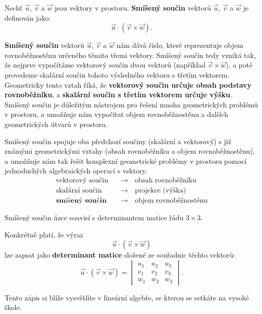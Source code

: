 \begin{definition}\label{def:scalar_triple_product}
    Nechť $\vec{u}$, $\vec{v}$ a $\vec{w}$ jsou vektory v prostoru. 
    \textbf{Smíšený součin} vektorů $\vec{u}$, $\vec{v}$ a $\vec{w}$ je definován jako:
    \begin{equation}\label{eq:scalar_triple_product}
        \vec{u} \cdot (\vec{v} \times \vec{w}).
    \end{equation}
\end{definition}

\textbf{Smíšený součin} vektorů $\vec{u}$, $\vec{v}$ a $\vec{w}$ nám dává číslo, které reprezentuje objem rovnoběžnostěnu určeného těmito třemi vektory.
Smíšený součin tedy vzniká tak, že nejprve vypočítáme vektorový součin dvou vektorů (například $\vec{v} \times \vec{w}$), a poté provedeme skalární součin tohoto výsledného vektoru s třetím vektorem.
Geometricky tento vztah říká, že \textbf{vektorový součin určuje obsah podstavy rovnoběžníku}, a \textbf{skalární součin s třetím vektorem určuje výšku}.
Smíšený součin je důležitým nástrojem pro řešení mnoha geometrických problémů v prostoru, a umožňuje nám vypočítat objem rovnoběžnostěnu a dalších geometrických útvarů v prostoru.

Smíšený součin spojuje oba předchozí součiny (skalární a vektorový) s již známými geometrickými vztahy (obsah rovnoběžníku a objem rovnoběžnostěnu), a umožňuje nám tak řešit komplexní geometrické problémy v prostoru pomocí jednoduchých algebraických operací s vektory.
\begin{align*}
    \text{vektorový součin} \quad &\rightarrow \quad \text{obsah rovnoběžníku} \\
    \text{skalární součin} \quad &\rightarrow \quad \text{projekce (výška)} \\
    \textbf{smíšený součin} \quad &\rightarrow \quad \text{objem rovnoběžnostěnu}
\end{align*}

\begin{remark}
    Smíšený součin úzce souvisí s determinantem matice řádu $3 \times 3$.

    Konkrétně platí, že výraz
    \[
    \vec{u} \cdot (\vec{v} \times \vec{w})
    \]
    lze zapsat jako \textbf{determinant matice} složené ze souřadnic těchto vektorů:
    \[
    \vec{u} \cdot (\vec{v} \times \vec{w})
    =
    \begin{vmatrix}
        u_1 & u_2 & u_3 \\
        v_1 & v_2 & v_3 \\
        w_1 & w_2 & w_3
    \end{vmatrix}.
    \]

    Tento zápis si blíže vysvětlíte v lineární algebře, se kterou se setkáte na vysoké škole.
\end{remark}







